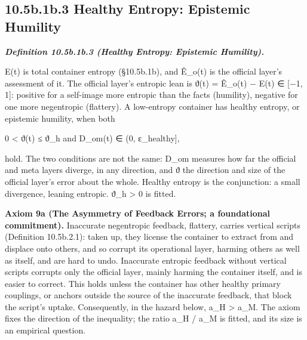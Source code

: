 \documentclass[
]{article}
\begin{document}
\hypertarget{b.1b.3-healthy-entropy-epistemic-humility}{%
\subsection{10.5b.1b.3 Healthy Entropy: Epistemic
Humility}\label{b.1b.3-healthy-entropy-epistemic-humility}}

\emph{\textbf{Definition 10.5b.1b.3 (Healthy Entropy: Epistemic
Humility).}}

E(t) is total container entropy (§10.5b.1b), and Ê\_o(t) is the official
layer's assessment of it. The official layer's entropic lean is ϑ(t) =
Ê\_o(t) − E(t) ∈ {[}−1, 1{]}: positive for a self-image more entropic
than the facts (humility), negative for one more negentropic (flattery).
A low-entropy container has healthy entropy, or epistemic humility, when
both

0 \textless{} ϑ(t) ≤ ϑ\_h and D\_om(t) ∈ (0, ε\_healthy{]},

hold. The two conditions are not the same: D\_om measures how far the
official and meta layers diverge, in any direction, and ϑ the direction
and size of the official layer's error about the whole. Healthy entropy
is the conjunction: a small divergence, leaning entropic. ϑ\_h
\textgreater{} 0 is fitted.

\textbf{Axiom 9a (The Asymmetry of Feedback Errors; a foundational
commitment).} Inaccurate negentropic feedback, flattery, carries
vertical scripts (Definition 10.5b.2.1): taken up, they license the
container to extract from and displace onto others, and so corrupt its
operational layer, harming others as well as itself, and are hard to
undo. Inaccurate entropic feedback without vertical scripts corrupts
only the official layer, mainly harming the container itself, and is
easier to correct. This holds unless the container has other healthy
primary couplings, or anchors outside the source of the inaccurate
feedback, that block the script's uptake. Consequently, in the hazard
below, a\_H \textgreater{} a\_M. The axiom fixes the direction of the
inequality; the ratio a\_H / a\_M is fitted, and its size is an
empirical question.
\end{document}
